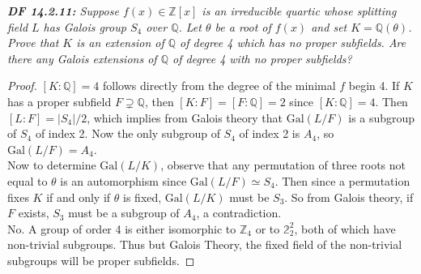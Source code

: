 \documentclass{article}
\begin{document}
\it \textbf{DF 14.2.11:} Suppose $f(x)\in\mathbb{Z}[x]$ is an irreducible
  quartic whose splitting field $L$ has Galois group $S_4$ over $\mathbb{Q}$.
  Let $\theta$ be a root of $f(x)$ and set $K=\mathbb{Q}(\theta)$. Prove
  that $K$ is an extension of $\mathbb{Q}$ of degree 4 which has no proper
  subfields. Are there any Galois extensions of $\mathbb{Q}$ of degree 4
  with no proper subfields?

  \begin{proof}
    $[K:\mathbb{Q}]=4$ follows directly from the degree of the minimal $f$
    begin 4. If $K$ has a proper subfield $F\supsetneq\mathbb{Q}$, then
    $[K:F]=[F:\mathbb{Q}]=2$ since $[K:\mathbb{Q}]=4$. Then
    $[L:F]=|S_4|/2$, which implies from Galois theory that
    $\text{Gal}(L/F)$ is a subgroup of $S_4$ of index 2. Now the only
    subgroup of $S_4$ of index 2 is $A_4$, so $\text{Gal}(L/F)=A_4$. \\

    Now to determine $\text{Gal}(L/K)$, observe that any permutation of
    three roots not equal to $\theta$ is an automorphism since
    $\text{Gal}(L/F)\simeq S_4$. Then since a permutation fixes $K$ if and
    only if $\theta$ is fixed, $\text{Gal}(L/K)$ must be $S_3$.  So from
    Galois theory, if $F$ exists, $S_3$ must be a subgroup of $A_4$, a
    contradiction. \\

    No. A group of order 4 is either isomorphic to $\mathbb{Z}_4$ or to
    $\mathbb{2}_2^2$, both of which have non-trivial subgroups. Thus but
    Galois Theory, the fixed field of the non-trivial subgroups will be
    proper subfields.
  \end{proof}
\end{document}
